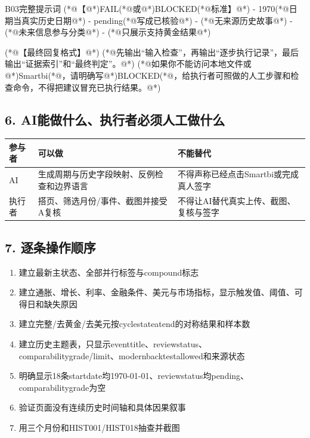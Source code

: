 \documentclass[UTF8,openany,zihao=-4]{ctexbook}
\renewcommand{\_}{\textunderscore\allowbreak}
\begin{document}
\begin{PromptBox}{B03完整提示词}
(*@{\promptcjk 【}@*)FAIL(*@{\promptcjk 或}@*)BLOCKED(*@{\promptcjk 标准】}@*)
- 1970(*@{\promptcjk 日期当真实历史日期}@*)
- pending(*@{\promptcjk 写成已核验}@*)
- (*@{\promptcjk 无来源历史故事}@*)
- (*@{\promptcjk 未来信息参与分类}@*)
- (*@{\promptcjk 只展示支持黄金结果}@*)

(*@{\promptcjk 【最终回复格式】}@*)
(*@{\promptcjk 先输出“输入检查”，再输出“逐步执行记录”，最后输出“证据索引”和“最终判定”。}@*)
(*@{\promptcjk 如果你不能访问本地文件或}@*)Smartbi(*@{\promptcjk ，请明确写}@*)BLOCKED(*@{\promptcjk ，给执行者可照做的人工步骤和检查命令，不得把建议冒充已执行结果。}@*)
\end{PromptBox}

\subsection*{6. AI能做什么、执行者必须人工做什么}
\noindent\begin{tabularx}{\textwidth}{@{}p{}XX@{}}
\toprule
\textbf{参与者} & \textbf{可以做} & \textbf{不能替代} \\
\midrule
AI & 生成周期与历史字段映射、反例检查和边界语言 & 不得声称已经点击Smartbi或完成真人签字 \\
执行者 & 搭页、筛选月份/事件、截图并接受A复核 & 不得让AI替代真实上传、截图、复核与签字 \\
\bottomrule
\end{tabularx}

\subsection*{7. 逐条操作顺序}
\begin{enumerate}
\item 建立最新主状态、全部并行标签与compound标志
\item 建立通胀、增长、利率、金融条件、美元与市场指标，显示触发值、阈值、可得日和缺失原因
\item 建立完整/去黄金/去美元按cycle\_state\_at\_end的对称结果和样本数
\item 建立历史主题表，只显示event\_title、review\_status、comparability\_grade/limit、modern\_backtest\_allowed和来源状态
\item 明确显示18条start\_date均1970-01-01、review\_status均pending、comparability\_grade为空
\item 验证页面没有连续历史时间轴和具体因果叙事
\item 用三个月份和HIST001/HIST018抽查并截图
\end{enumerate}
\end{document}
